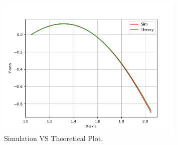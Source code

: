 \documentclass[journal]{IEEEtran}
\numberwithin{equation}{enumi}
\numberwithin{figure}{enumi}
\begin{document}
\begin{figure}[H]
    \centering
    \includegraphics[width=0.8\textwidth]{figs/fig.png}
    \caption{Simulation VS Theoretical Plot.}
\end{figure}
\end{document}
